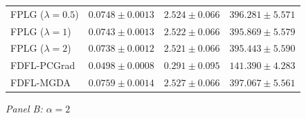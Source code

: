 \begin{table}[htbp]
\begin{tabular}{l ccc}
FPLG ($\lambda\!=\!0.5$)                     & $0.0748 \pm 0.0013$ & $2.524 \pm 0.066$ & $396.281 \pm 5.571$ \\
FPLG ($\lambda\!=\!1$)                       & $0.0743 \pm 0.0013$ & $2.522 \pm 0.066$ & $395.869 \pm 5.579$ \\
FPLG ($\lambda\!=\!2$)                       & $0.0738 \pm 0.0012$ & $2.521 \pm 0.066$ & $395.443 \pm 5.590$ \\
\midrule
FDFL-PCGrad                                  & $0.0498 \pm 0.0008$ & $\mathbf{0.291 \pm 0.095}$ & $141.390 \pm 4.283$ \\
FDFL-MGDA                                    & $0.0759 \pm 0.0014$ & $2.527 \pm 0.066$ & $397.067 \pm 5.561$ \\
\bottomrule
\end{tabular}

\bigskip
\textit{Panel B: $\alpha = 2$}


\end{table}
